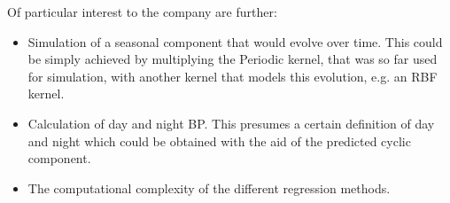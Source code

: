 Of particular interest to the company are further:
\begin{itemize}
    \item Simulation of a seasonal component that would evolve over time. This
    could be simply achieved by multiplying the Periodic kernel, that was
    so far used for simulation, with another kernel that models this evolution, e.g. an RBF kernel.
    \item Calculation of day and night BP. This presumes a certain definition of day and night
    which could be obtained with the aid of the predicted cyclic component.
    \item The computational complexity of the different regression methods.
\end{itemize}









%
%
%
%

